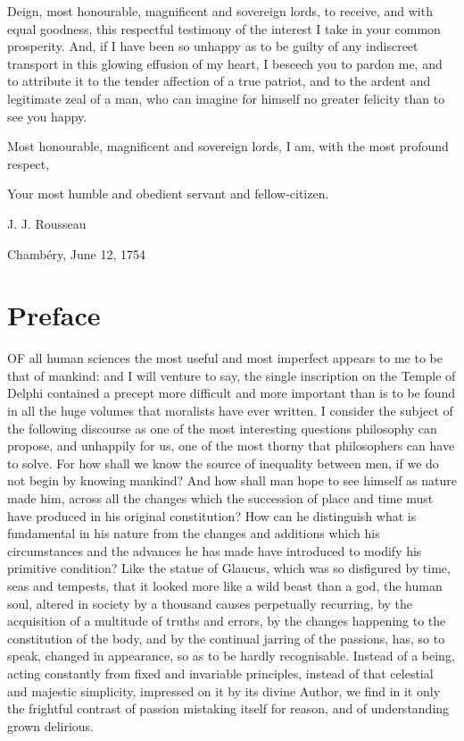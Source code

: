 \documentclass[12pt]{report}
\begin{document}
Deign, most honourable, magnificent and sovereign lords, to receive, and with equal goodness, this respectful testimony of the interest I take in your common prosperity. And, if I have been so unhappy as to be guilty of any indiscreet transport in this glowing effusion of my heart, I beseech you to pardon me, and to attribute it to the tender affection of a true patriot, and to the ardent and legitimate zeal of a man, who can imagine for himself no greater felicity than to see you happy.

Most honourable, magnificent and sovereign lords, I am, with the most profound respect,

Your most humble and obedient servant and fellow-citizen.

\hfill J. J. Rousseau

\hfill Chambéry, June 12, 1754

\chapter*{Preface}
OF all human sciences the most useful and most imperfect appears to me to be that of mankind: and I will venture to say, the single inscription on the Temple of Delphi contained a precept more difficult and more important than is to be found in all the huge volumes that moralists have ever written. I consider the subject of the following discourse as one of the most interesting questions philosophy can propose, and unhappily for us, one of the most thorny that philosophers can have to solve. For how shall we know the source of inequality between men, if we do not begin by knowing mankind? And how shall man hope to see himself as nature made him, across all the changes which the succession of place and time must have produced in his original constitution? How can he distinguish what is fundamental in his nature from the changes and additions which his circumstances and the advances he has made have introduced to modify his primitive condition? Like the statue of Glaucus, which was so disfigured by time, seas and tempests, that it looked more like a wild beast than a god, the human soul, altered in society by a thousand causes perpetually recurring, by the acquisition of a multitude of truths and errors, by the changes happening to the constitution of the body, and by the continual jarring of the passions, has, so to speak, changed in appearance, so as to be hardly recognisable. Instead of a being, acting constantly from fixed and invariable principles, instead of that celestial and majestic simplicity, impressed on it by its divine Author, we find in it only the frightful contrast of passion mistaking itself for reason, and of understanding grown delirious.
\end{document}
